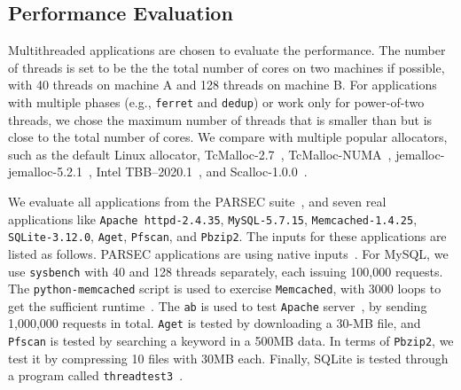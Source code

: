 \subsection{Performance Evaluation}

\label{sec:performance}

Multithreaded applications are chosen to evaluate  the performance. The number of threads is set to be the the total number of cores on two machines if possible, with 40 threads on machine A and 128 threads on machine B. For applications with multiple phases (e.g., \texttt{ferret} and \texttt{dedup}) or work only for power-of-two threads, we chose the maximum number of threads that is smaller than but is close to the total number of cores.  We compare \NM{} with multiple popular allocators, such as the default Linux allocator, TcMalloc-2.7~\cite{tcmalloc},  TcMalloc-NUMA~\cite{tcmallocnew}, jemalloc-jemalloc-5.2.1~\cite{jemalloc}, Intel TBB--2020.1~\cite{tbb}, and Scalloc-1.0.0~\cite{Scalloc}. 

We evaluate all applications from the PARSEC suite~\cite{parsec}, and seven real applications like \texttt{Apache httpd-2.4.35}, \texttt{MySQL-5.7.15}, \texttt{Memcached-1.4.25}, \texttt{SQLite-3.12.0}, \texttt{Aget}, \texttt{Pfscan}, and \texttt{Pbzip2}. 
The inputs for these applications are listed as follows. PARSEC applications are using native inputs~\cite{parsec}. For MySQL, we use \texttt{sysbench} with 40 and 128 threads separately, each issuing 100,000  requests. The \texttt{python-memcached} script is used to exercise \texttt{Memcached}, with 3000 loops to get the sufficient runtime~\cite{memcached}. The \texttt{ab} is used to test \texttt{Apache} server~\cite{apachetest}, by sending 1,000,000 requests in total. \texttt{Aget} is tested by downloading a 30-MB file, and \texttt{Pfscan} is tested by searching  a keyword in a 500MB data. In terms of \texttt{Pbzip2}, we test it by compressing 10 files with 30MB each. Finally, SQLite is tested through a program called \texttt{threadtest3}~\cite{sqlitetest}. 



